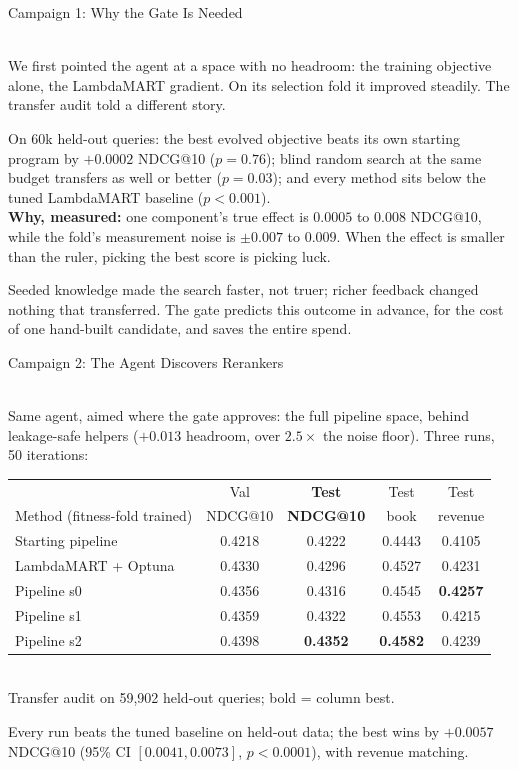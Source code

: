 \documentclass{article}
\newcommand{\HeadSize}{\fontsize{50}{58}\selectfont\bfseries\color{accent}}
\newcommand{\SmallSize}{\fontsize{25}{33}\selectfont}
\newcommand{\SectionHead}[1]{{\HeadSize\begin{minipage}[t]{\linewidth}\raggedright #1\end{minipage}}\\[4mm]}
\newenvironment{block}[1][accentfill]{%
  \begin{tcolorbox}[enhanced,colback=#1,colframe=accent,boxrule=1.2pt,
    arc=4mm,left=8mm,right=8mm,top=6mm,bottom=6mm]}{\end{tcolorbox}\vspace{6mm}}
\begin{document}
\begin{minipage}[t]{0.315\textwidth}
\SectionHead{Campaign 1: Why the Gate Is Needed}
We first pointed the agent at a space with no headroom: the training
objective alone, the LambdaMART gradient. On its selection fold it improved
steadily. The transfer audit told a different story.\\[3mm]
\begin{block}[winefill]
On 60k held-out queries: the best evolved objective beats its own starting
program by $+0.0002$ NDCG@10 ($p=0.76$); blind random search at the same
budget transfers as well or better ($p=0.03$); and every method sits below
the tuned LambdaMART baseline ($p<0.001$).\\[3mm]
\textbf{Why, measured:} one component's true effect is $0.0005$ to $0.008$
NDCG@10, while the fold's measurement noise is $\pm0.007$ to $0.009$.
When the effect is smaller than the ruler, picking the best score is
picking luck.
\end{block}
Seeded knowledge made the search faster, not truer; richer feedback
changed nothing that transferred. The gate predicts this outcome in
advance, for the cost of one hand-built candidate, and saves the entire
spend.\\[5mm]

\SectionHead{Campaign 2: The Agent Discovers Rerankers}
Same agent, aimed where the gate approves: the full pipeline space, behind
leakage-safe helpers ($+0.013$ headroom, over $2.5\times$ the noise
floor). Three runs, 50 iterations:\\[3mm]
\begin{center}\SmallSize
\begin{tabular}{lcccc}
\toprule
 & Val & \textbf{Test} & Test & Test\\
Method (fitness-fold trained) & NDCG@10 & \textbf{NDCG@10} & book & revenue\\
\midrule
Starting pipeline    & 0.4218 & 0.4222 & 0.4443 & 0.4105\\
LambdaMART + Optuna  & 0.4330 & 0.4296 & 0.4527 & 0.4231\\
Pipeline s0          & 0.4356 & 0.4316 & 0.4545 & \textbf{0.4257}\\
Pipeline s1          & 0.4359 & 0.4322 & 0.4553 & 0.4215\\
Pipeline s2          & 0.4398 & \textbf{0.4352} & \textbf{0.4582} & 0.4239\\
\bottomrule
\end{tabular}\\[2mm]
Transfer audit on 59{,}902 held-out queries; bold = column best.
\end{center}
\vspace{3mm}
Every run beats the tuned baseline on held-out data; the best wins by
$+0.0057$ NDCG@10 (95\% CI $[0.0041, 0.0073]$, $p<0.0001$), with revenue
matching.\\[4mm]


\end{minipage}
\end{document}
